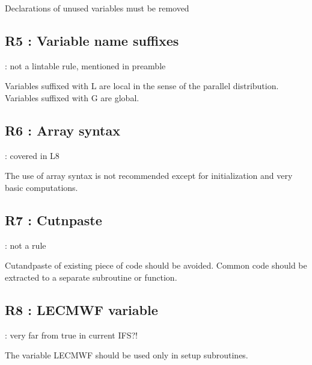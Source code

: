 \documentclass[letterpaper,10pt,english]{sphinxmanual}
\begin{document}
\sphinxAtStartPar
Declarations of unused variables must be removed

\sphinxstepscope


\subsection{R5 :  Variable name suffixes}
\label{\detokenize{obsolescent/r5:r5-variable-name-suffixes}}\label{\detokenize{obsolescent/r5::doc}}
\sphinxAtStartPar
{} : not a lintable rule, mentioned in preamble

\sphinxAtStartPar
Variables suffixed with L are local in the sense of the parallel distribution.
Variables suffixed with G are global.

\sphinxstepscope


\subsection{R6 :  Array syntax}
\label{\detokenize{obsolescent/r6:r6-array-syntax}}\label{\detokenize{obsolescent/r6::doc}}
\sphinxAtStartPar
{} : covered in L8

\sphinxAtStartPar
The use of array syntax is not recommended except for initialization and very basic computations.

\sphinxstepscope


\subsection{R7 :  Cut\sphinxhyphen{}n\sphinxhyphen{}paste}
\label{\detokenize{obsolescent/r7:r7-cut-n-paste}}\label{\detokenize{obsolescent/r7::doc}}
\sphinxAtStartPar
{} : not a rule

\sphinxAtStartPar
Cut\sphinxhyphen{}and\sphinxhyphen{}paste  of  existing  piece  of  code  should  be  avoided.
Common  code should be extracted to a separate subroutine or function.

\sphinxstepscope


\subsection{R8 :  LECMWF variable}
\label{\detokenize{obsolescent/r8:r8-lecmwf-variable}}\label{\detokenize{obsolescent/r8::doc}}
\sphinxAtStartPar
{} : very far from true in current IFS?!

\sphinxAtStartPar
The variable LECMWF should be used only in setup subroutines.
\end{document}

